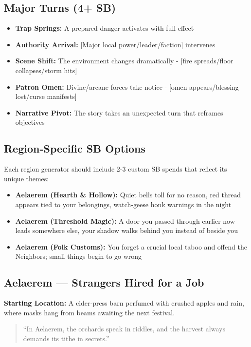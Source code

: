 \subsection*{Major Turns (4+ SB)}
\begin{itemize}
\item \textbf{Trap Springs:} A prepared danger activates with full effect
\item \textbf{Authority Arrival:} [Major local power/leader/faction] intervenes
\item \textbf{Scene Shift:} The environment changes dramatically - [fire spreads/floor collapses/storm hits]
\item \textbf{Patron Omen:} Divine/arcane forces take notice - [omen appears/blessing lost/curse manifests]
\item \textbf{Narrative Pivot:} The story takes an unexpected turn that reframes objectives
\end{itemize}

\subsection*{Region-Specific SB Options}
Each region generator should include 2-3 custom SB spends that reflect its unique themes:

\begin{itemize}
\item \textbf{Aelaerem (Hearth \& Hollow):} Quiet bells toll for no reason, red thread appears tied to your belongings, watch-geese honk warnings in the night
\item \textbf{Aelaerem (Threshold Magic):} A door you passed through earlier now leads somewhere else, your shadow walks behind you instead of beside you
\item \textbf{Aelaerem (Folk Customs):} You forget a crucial local taboo and offend the Neighbors; small things begin to go wrong
\end{itemize}

\subsection*{Aelaerem — Strangers Hired for a Job}
\textbf{Starting Location:} A cider‑press barn perfumed with crushed apples and rain, where masks hang from beams awaiting the next festival.
\begin{quote}
“In Aelaerem, the orchards speak in riddles, and the harvest always demands its tithe in secrets.”
\end{quote}

